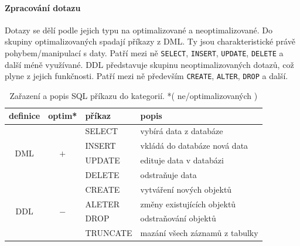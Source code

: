 \documentclass[a4paper,12pt,oneside]{report}
\begin{document}
\paragraph*{Zpracování dotazu}
Dotazy se dělí podle jejich typu na optimalizované a
neoptimalizované. Do skupiny optimalizovaných spadají příkazy z
\ac{DML}. Ty jsou charakteristické právě pohybem/manipulací s
daty. Patří mezi ně \texttt{SELECT}, \texttt{INSERT}, \texttt{UPDATE},
\texttt{DELETE} a další méně využívané.    \acs{DDL} představuje skupinu
neoptimalizovaných dotazů, což plyne z jejich funkčnosti. Patří mezi
ně především \texttt{CREATE}, \texttt{ALTER}, \texttt{DROP} a
další. \cite{bares}


\begin{table}[h]
   \centering
\begin{tabular}{|ccll|}
\hline
definice & optim* & příkaz & popis \\ \hline \hline
\multirow{4}{*}{DML} & \multirow{4}{*}{$+$} & SELECT & vybírá data z databáze \\
 &  & INSERT & vkládá do databáze nová data \\
 &  & UPDATE & edituje data v databázi \\
 &  & DELETE & odstraňuje data \\ \hline
\multirow{4}{*}{DDL} & \multirow{4}{*}{$-$} & CREATE & vytváření nových objektů \\
 &  & ALETER & změny existujících objektů \\
 &  & DROP & odstraňování objektů \\
 &  & TRUNCATE & mazání všech záznamů z tabulky \\ \hline
\end{tabular}

\caption{Zařazení a popis \acs{SQL} příkazu do kategorií.
*( ne/optimalizovaných )}
\label{tab:prikazy}
\end{table}
\end{document}
